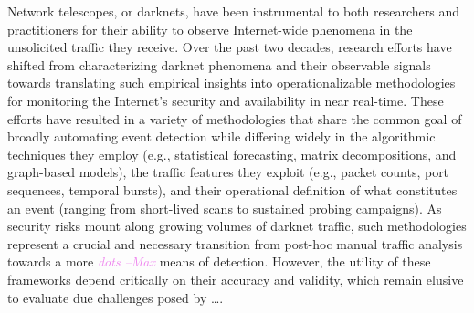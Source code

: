 \documentclass[manuscript,nonacm]{acmart}
\newcommand{\maxnote}[1]{\textit{\textcolor{violet}{#1 --Max}}}
\begin{document}
Network telescopes, or darknets, have been instrumental to both researchers and practitioners for their ability to observe Internet-wide phenomena in the unsolicited traffic they receive. 
Over the past two decades, research efforts have shifted from characterizing darknet phenomena and their observable signals towards translating such empirical insights into operationalizable methodologies for monitoring the Internet's security and availability in near real-time.
These efforts have resulted in a variety of methodologies that share the common goal of broadly automating event detection while differing widely in the algorithmic techniques they employ (e.g., statistical forecasting, matrix decompositions, and graph-based models), 
the traffic features they exploit (e.g., packet counts, port sequences, temporal bursts), 
and their operational definition of what constitutes an event (ranging from short-lived scans to sustained probing campaigns).
As security risks mount along growing volumes of darknet traffic, such methodologies represent a crucial and necessary transition from post-hoc manual traffic analysis towards a more \maxnote{dots} means of detection.
However, the utility of these frameworks depend critically on their accuracy and validity, which remain elusive to evaluate due challenges posed by \dots.


\end{document}
